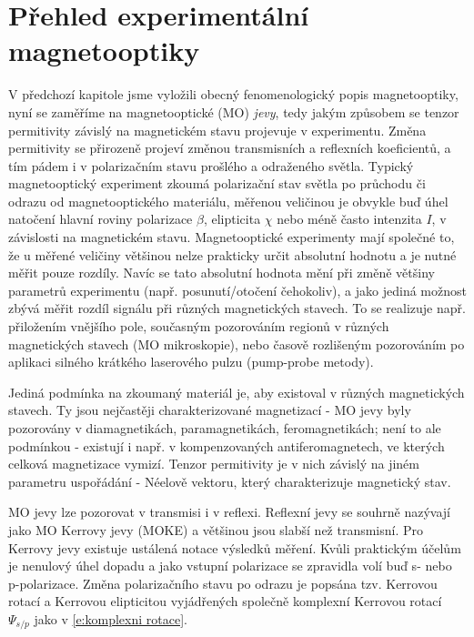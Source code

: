 \chapter{Přehled experimentální magnetooptiky} \label{k:magnetooptika}

V předchozí kapitole jsme vyložili obecný fenomenologický popis magnetooptiky, nyní se zaměříme na magnetooptické (MO) \emph{jevy}, tedy jakým způsobem se tenzor permitivity závislý na magnetickém stavu projevuje v experimentu.
Změna permitivity se přirozeně projeví změnou transmisních a reflexních koeficientů, a tím pádem i v polarizačním stavu prošlého a odraženého světla.
Typický magnetooptický experiment zkoumá polarizační stav světla po průchodu či odrazu od magnetooptického materiálu, měřenou veličinou je obvykle buď úhel natočení hlavní roviny polarizace $\beta$, elipticita $\chi$ nebo méně často intenzita $I$, v závislosti na magnetickém stavu.
Magnetooptické experimenty mají společné to, že u měřené veličiny většinou nelze prakticky určit absolutní hodnotu a je nutné měřit pouze rozdíly.
Navíc se tato absolutní hodnota mění při změně většiny parametrů experimentu (např. posunutí/otočení čehokoliv), a jako jediná možnost zbývá měřit rozdíl signálu při různých magnetických stavech. To se realizuje např. přiložením vnějšího pole, současným pozorováním regionů v různých magnetických stavech (MO mikroskopie), nebo časově rozlišeným pozorováním po aplikaci silného krátkého laserového pulzu (pump-probe metody).

Jediná podmínka na zkoumaný materiál je, aby existoval v různých magnetických stavech.
Ty jsou nejčastěji charakterizované magnetizací - MO jevy byly pozorovány v diamagnetikách, paramagnetikách, feromagnetikách; není to ale podmínkou - existují i např. v kompenzovaných antiferomagnetech\cite{SaidlOpticalNeel}, ve kterých celková magnetizace vymizí. Tenzor permitivity je v nich závislý na jiném parametru uspořádání - Néelově vektoru, který charakterizuje magnetický stav.

MO jevy lze pozorovat v transmisi i v reflexi.
Reflexní jevy se souhrně nazývají jako MO Kerrovy jevy (MOKE) a většinou jsou slabší než transmisní.
Pro Kerrovy jevy existuje ustálená notace výsledků měření.
Kvůli praktickým účelům je nenulový úhel dopadu a jako vstupní polarizace se zpravidla volí buď s- nebo p-polarizace. Změna polarizačního stavu po odrazu je popsána tzv. Kerrovou rotací a Kerrovou elipticitou vyjádřených společně komplexní Kerrovou rotací $\Psi_{s/p}$ jako v \eqref{e:komplexni rotace}.


